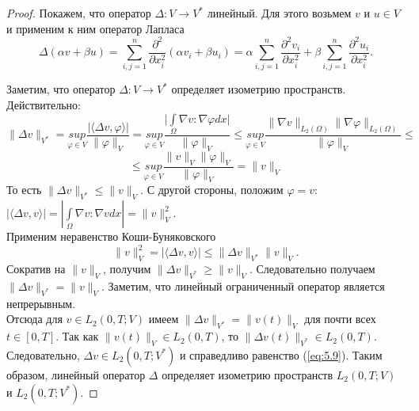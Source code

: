 \begin{proof}
        Покажем, что оператор $\Delta : V\rightarrow V^*$ линейный. 
        Для этого возьмем $v$ и $u\in V$ и применим к ним оператор Лапласа
        $$\Delta (\alpha v+\beta u)= \sum_{i,j=1}^{n} \frac{\partial^2}{\partial x_i^2} (\alpha v_i+\beta u_i)=
        \alpha \sum_{i,j=1}^{n} \frac{\partial^2 v_i}{\partial x_i^2}+\beta \sum_{i,j=1}^{n} \frac{\partial^2 u_i}{\partial x_i^2}.$$

        Заметим, что оператор $\Delta : V\rightarrow V^*$ определяет изометрию пространств. Действительно:
        $$\| \Delta v \|_{V^*}=\underset{\varphi\in V}{sup} \frac{|\langle \Delta v,\varphi \rangle|}{\| \varphi\|_V}=\underset{\varphi\in V}{sup} 
        \frac{\bigg|\int\limits_{\Omega}\nabla v:\nabla\varphi dx\bigg|}{\| \varphi\|_V}\le
        \underset{\varphi\in V}{sup} \frac{\|\nabla v\|_{L_2(\Omega)}\|\nabla \varphi\|_{L_2(\Omega)}}{\|\varphi\|_V}\le$$
        $$\le\underset{\varphi\in V}{sup} \frac{\| v \|_{V} \| \varphi \|_{V}}{\| \varphi \|_{V}}=\| v \|_{V}$$
        То есть $\| \Delta v \|_{V^*}\le\| v \|_{V}.$ С другой стороны, положим $\varphi=v:$\\
        $|\langle \Delta v,v \rangle|=|\int\limits_{\Omega}\nabla v:\nabla v dx|=\|v\|_V^2.$\\
        Применим неравенство Коши-Буняковского
        $$\|v\|_V^2=|\langle \Delta v,v\rangle|\le\|\Delta v\|_{V^*}\| v\|_{V}.$$
        Сократив на $\|v\|_V$, получим $\|\Delta v\|_{V^*}\ge\|v\|_V.$
        Следовательно получаем $\|\Delta v\|_{V^*}=\|v\|_V.$
        Заметим, что линейный ограниченный оператор является непрерывным.\\
        Отсюда для $v \in L_2(0, T; V)$ имеем
        $\| \Delta v \|_{V^\ast} = \| v(t) \|_V$ для почти всех\linebreak$t \in [0, T]$. Так как $\| v(t) \|_V \in L_2(0, T)$,
        то $\| \Delta v(t)\|_{V^*} \in L_2(0, T)$. Следовательно, $\Delta v \in L_2(0, T; V^\ast)$ и справедливо
        равенство (\ref{eq:5.9}). Таким образом, линейный оператор $\Delta$ определяет изометрию пространств $L_2(0, T; V)$ и $L_2(0, T; V^\ast)$.
        

\end{proof}
